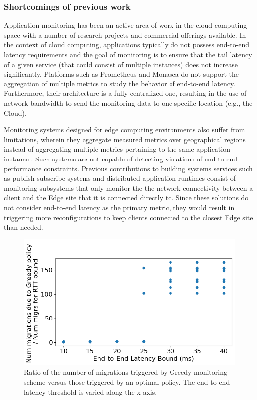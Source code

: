 \subsubsection{Shortcomings of previous work}
\par Application monitoring has been an active area of work in the cloud computing space with a number of research projects and commercial offerings available. In the context of cloud computing, applications typically do not possess end-to-end latency requirements and the goal of monitoring is to ensure that the tail latency of a given service (that could consist of multiple instances) does not increase significantly. Platforms such as Prometheus \cite{prometheus} and Monasca \cite{monasca} do not support the aggregation of multiple metrics to study the behavior of end-to-end latency. Furthermore, their architecture is a fully centralized one, resulting in the use of network bandwidth to send the monitoring data to one specific location (e.g., the Cloud).
\par Monitoring systems designed for edge computing environments also suffer from limitations, wherein they aggregate measured metrics over geographical regions instead of aggregating multiple metrics pertaining to the same application instance \cite{fmone, gonccalves2021dynamic}. Such systems are not capable of detecting violations of end-to-end performance constraints. Previous contributions to building systems services such as publish-subscribe systems \cite{emma} and distributed application runtimes \cite{foglets} consist of monitoring subsystems that only monitor the the network connectivity between a client and the Edge site that it is connected directly to. Since these solutions do not consider end-to-end latency as the primary metric, they would result in triggering more reconfigurations to keep clients connected to the closest Edge site than needed.
\begin{figure}
\centering
\includegraphics[width=0.75\linewidth]{figures/mechanisms/monitoring/migrations_count.png}
\caption{Ratio of the number of migrations triggered by Greedy monitoring scheme versus those triggered by an optimal policy. The end-to-end latency threshold is varied along the x-axis.}
\label{fig:migration_count}
\end{figure}
